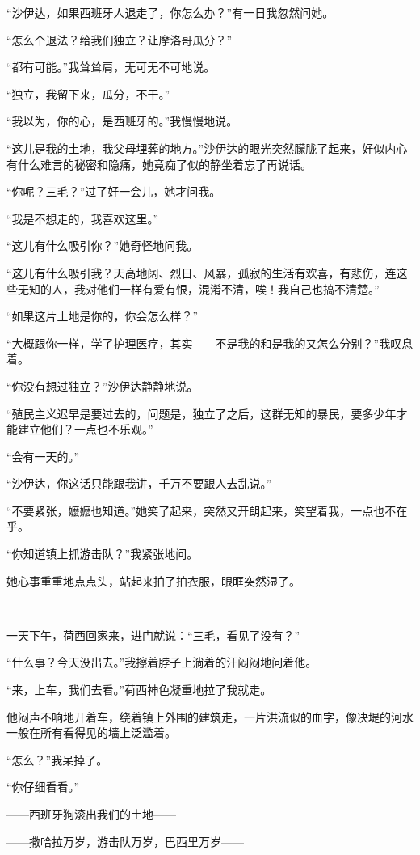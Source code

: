 \par “沙伊达，如果西班牙人退走了，你怎么办？”有一日我忽然问她。
\par “怎么个退法？给我们独立？让摩洛哥瓜分？”
\par “都有可能。”我耸耸肩，无可无不可地说。
\par “独立，我留下来，瓜分，不干。”
\par “我以为，你的心，是西班牙的。”我慢慢地说。
\par “这儿是我的土地，我父母埋葬的地方。”沙伊达的眼光突然朦胧了起来，好似内心有什么难言的秘密和隐痛，她竟痴了似的静坐着忘了再说话。
\par “你呢？三毛？”过了好一会儿，她才问我。
\par “我是不想走的，我喜欢这里。”
\par “这儿有什么吸引你？”她奇怪地问我。
\par “这儿有什么吸引我？天高地阔、烈日、风暴，孤寂的生活有欢喜，有悲伤，连这些无知的人，我对他们一样有爱有恨，混淆不清，唉！我自己也搞不清楚。”
\par “如果这片土地是你的，你会怎么样？”
\par “大概跟你一样，学了护理医疗，其实——不是我的和是我的又怎么分别？”我叹息着。
\par “你没有想过独立？”沙伊达静静地说。
\par “殖民主义迟早是要过去的，问题是，独立了之后，这群无知的暴民，要多少年才能建立他们？一点也不乐观。”
\par “会有一天的。”
\par “沙伊达，你这话只能跟我讲，千万不要跟人去乱说。”
\par “不要紧张，嬷嬷也知道。”她笑了起来，突然又开朗起来，笑望着我，一点也不在乎。
\par “你知道镇上抓游击队？”我紧张地问。
\par 她心事重重地点点头，站起来拍了拍衣服，眼眶突然湿了。
\par  
\par 一天下午，荷西回家来，进门就说：“三毛，看见了没有？”
\par “什么事？今天没出去。”我擦着脖子上淌着的汗闷闷地问着他。
\par “来，上车，我们去看。”荷西神色凝重地拉了我就走。
\par 他闷声不响地开着车，绕着镇上外围的建筑走，一片洪流似的血字，像决堤的河水一般在所有看得见的墙上泛滥着。
\par “怎么？”我呆掉了。
\par “你仔细看看。”
\par ——西班牙狗滚出我们的土地——
\par ——撒哈拉万岁，游击队万岁，巴西里万岁——
